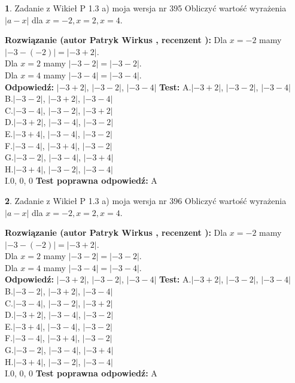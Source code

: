\documentclass[12pt, a4paper]{article}
\theoremstyle{definition} %
\newtheorem{zad}{}
\newcommand{\zadStart}[1]{\begin{zad}#1\newline}
\newcommand{\zadStop}{\end{zad}}
\newcommand{\rozwStart}[2]{\noindent \textbf{Rozwiązanie (autor #1 , recenzent #2): }\newline}
\newcommand{\rozwStop}{\newline}
\newcommand{\odpStart}{\noindent \textbf{Odpowiedź:}\newline}
\newcommand{\odpStop}{\newline}
\newcommand{\testStart}{\noindent \textbf{Test:}\newline}
\newcommand{\testStop}{\newline}
\newcommand{\kluczStart}{\noindent \textbf{Test poprawna odpowiedź:}\newline}
\newcommand{\kluczStop}{\newline}
\begin{document}
\zadStart{Zadanie z Wikieł P 1.3 a) moja wersja nr 395}
Obliczyć wartość wyrażenia $|a - x|$ dla $x=-2,x=2,x=4$.
\zadStop
\rozwStart{Patryk Wirkus}{}
Dla $x = -2$ mamy $|-3 - (-2)| = |-3 + 2|$.\\
Dla $x = 2$ mamy $|-3 - 2| = |-3 - 2|$.\\
Dla $x = 4$ mamy $|-3 - 4| = |-3 - 4|$.\\
\rozwStop
\odpStart
$|-3 + 2|$, $|-3 - 2|$, $|-3 - 4|$
\odpStop
\testStart
A.$|-3 + 2|$, $|-3 - 2|$, $|-3 - 4|$\\
B.$|-3 - 2|$, $|-3 + 2|$, $|-3 - 4|$\\
C.$|-3 - 4|$, $|-3 - 2|$, $|-3 + 2|$\\
D.$|-3 + 2|$, $|-3 - 4|$, $|-3 - 2|$\\
E.$|-3 + 4|$, $|-3 - 4|$, $|-3 - 2|$\\
F.$|-3 - 4|$, $|-3 + 4|$, $|-3 - 2|$\\
G.$|-3 - 2|$, $|-3 - 4|$, $|-3 + 4|$\\
H.$|-3 + 4|$, $|-3 - 2|$, $|-3 - 4|$\\
I.$0$, $0$, $0$
\testStop
\kluczStart
A
\kluczStop



\zadStart{Zadanie z Wikieł P 1.3 a) moja wersja nr 396}
Obliczyć wartość wyrażenia $|a - x|$ dla $x=-2,x=2,x=4$.
\zadStop
\rozwStart{Patryk Wirkus}{}
Dla $x = -2$ mamy $|-3 - (-2)| = |-3 + 2|$.\\
Dla $x = 2$ mamy $|-3 - 2| = |-3 - 2|$.\\
Dla $x = 4$ mamy $|-3 - 4| = |-3 - 4|$.\\
\rozwStop
\odpStart
$|-3 + 2|$, $|-3 - 2|$, $|-3 - 4|$
\odpStop
\testStart
A.$|-3 + 2|$, $|-3 - 2|$, $|-3 - 4|$\\
B.$|-3 - 2|$, $|-3 + 2|$, $|-3 - 4|$\\
C.$|-3 - 4|$, $|-3 - 2|$, $|-3 + 2|$\\
D.$|-3 + 2|$, $|-3 - 4|$, $|-3 - 2|$\\
E.$|-3 + 4|$, $|-3 - 4|$, $|-3 - 2|$\\
F.$|-3 - 4|$, $|-3 + 4|$, $|-3 - 2|$\\
G.$|-3 - 2|$, $|-3 - 4|$, $|-3 + 4|$\\
H.$|-3 + 4|$, $|-3 - 2|$, $|-3 - 4|$\\
I.$0$, $0$, $0$
\testStop
\kluczStart
A
\kluczStop
\end{document}
